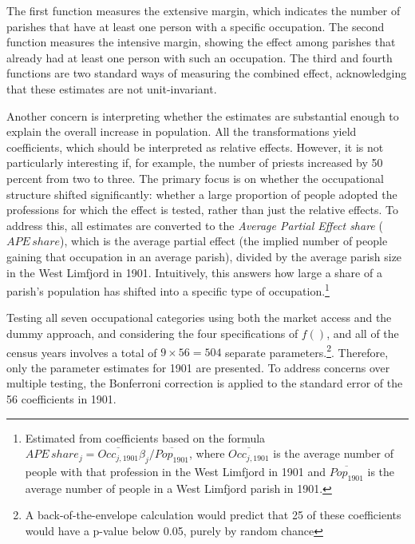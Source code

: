 \documentclass[11pt]{article}
\begin{document}
The first function measures the extensive margin, which indicates the number of parishes that have at least one person with a specific occupation. The second function measures the intensive margin, showing the effect among parishes that already had at least one person with such an occupation. The third and fourth functions are two standard ways of measuring the combined effect, acknowledging that these estimates are not unit-invariant. 

Another concern is interpreting whether the estimates are substantial enough to explain the overall increase in population. All the transformations yield coefficients, which should be interpreted as relative effects. However, it is not particularly interesting if, for example, the number of priests increased by 50 percent from two to three. The primary focus is on whether the occupational structure shifted significantly: whether a large proportion of people adopted the professions for which the effect is tested, rather than just the relative effects. To address this, all estimates are converted to the \textit{Average Partial Effect share} ($APE\,share$), which is the average partial effect (the implied number of people gaining that occupation in an average parish), divided by the average parish size in the West Limfjord in 1901. Intuitively, this answers how large a share of a parish's population has shifted into a specific type of occupation.\footnote{Estimated from coefficients based on the formula $APE\,share_j = \overline{Occ_{j, 1901}}\beta_j / \overline{Pop_{1901}}$, where $\overline{Occ_{j, 1901}}$ is the average number of people with that profession in the West Limfjord in 1901 and $\overline{Pop_{1901}}$ is the average number of people in a West Limfjord parish in 1901. } 

Testing all seven occupational categories using both the market access and the dummy approach, and considering the four specifications of $f()$, and all of the census years involves a total of $9\times56 = 504$ separate parameters.\footnote{A back-of-the-envelope calculation would predict that 25 of these coefficients would have a p-value below 0.05, purely by random chance}. Therefore, only the parameter estimates for 1901 are presented. To address concerns over multiple testing, the Bonferroni correction is applied to the standard error of the 56 coefficients in 1901.
\end{document}
